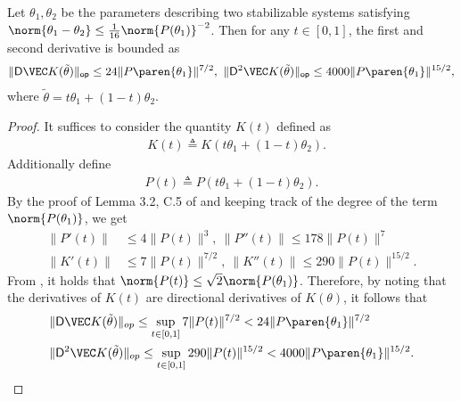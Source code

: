 \begin{lemma}
    \label{lem: Bound on K' and K''}
    Let $\theta_1, \theta_2$ be the parameters describing two stabilizable systems satisfying $\norm{\theta_1-\theta_2}\leq \frac{1}{16} \norm{P(\theta_1)}^{-2}$. Then for any $t\in[0,1]$, the first and second derivative is bounded as 
    \begin{align*}
        \|\mathsf{D}\VEC K(\tilde\theta)\|_{\mathsf{op}}\leq 24\|P\paren{\theta_1}\|^{7/2}, ~ 
        \|\mathsf{D}^2\VEC K(\tilde\theta)\|_{\mathsf{op}}\leq 4000\|P\paren{\theta_1}\|^{15/2},
    \end{align*}
    where $\tilde \theta = t\theta_1 + (1-t)\theta_2$.
\end{lemma}
\begin{proof}
    It suffices to consider the quantity $K(t)$ defined as
    \begin{align*}
        &K(t) \triangleq K(t\theta_1 + (1-t)\theta_2). 
    \end{align*}
    Additionally define
    \begin{align*}
        P(t) \triangleq P(t\theta_1 + (1-t)\theta_2).
    \end{align*}
    By the proof of Lemma 3.2, C.5 of \citet{simchowitz2020naive} and keeping track of the degree of the term $\norm{P(\theta_1)}$, we get
    \begin{align*}
        \|P'(t)\|&\leq 4\|P(t)\|^3 , 
        ~ \|P''(t)\|\leq178\|P(t)\|^7 \\
        \|K'(t)\|&\leq7\|P(t)\|^{7/2} , ~\|K''(t)\|\leq290\|P(t)\|^{15/2}.
    \end{align*}
    From , it holds that $\norm{P(t)} \leq \sqrt{2}\norm{P(\theta_1)}$. Therefore, by noting that the derivatives of $K(t)$ are directional derivatives of $K(\theta)$, it follows that
    \begin{align*}
        &\|\mathsf{D}\VEC K(\tilde\theta)\|_{op}\leq \sup_{t\in[
        0,1]}7\|P(t)\|^{7/2} < 24\|P\paren{\theta_1}\|^{7/2} \\
        &\|\mathsf{D}^2\VEC K(\tilde\theta)\|_{op}\leq \sup_{t\in[
        0,1]}290\|P(t)\|^{15/2} <
        4000\|P\paren{\theta_1}\|^{15/2}.
    \end{align*}
\end{proof}

